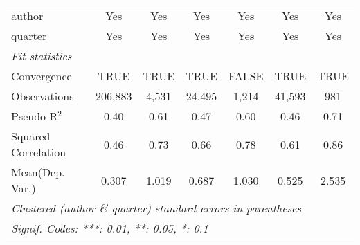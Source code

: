 \begin{tabular}{lcccccc}
   author                                                     & Yes           & Yes           & Yes           & Yes           & Yes          & Yes\\  
   quarter                                                    & Yes           & Yes           & Yes           & Yes           & Yes          & Yes\\  
   \midrule
   \emph{Fit statistics}\\
   Convergence                                                &TRUE           & TRUE          & TRUE          & FALSE         & TRUE         & TRUE\\  
   Observations                                               & 206,883       & 4,531         & 24,495        & 1,214         & 41,593       & 981\\  
   Pseudo R$^2$                                               & 0.40          & 0.61          & 0.47          & 0.60          & 0.46         & 0.71\\  
   Squared Correlation                                        & 0.46          & 0.73          & 0.66          & 0.78          & 0.61         & 0.86\\  
Mean(Dep. Var.) & 0.307 & 1.019 & 0.687 & 1.030 & 0.525 & 2.535 \\
   \midrule \midrule
   \multicolumn{7}{l}{\emph{Clustered (author \& quarter) standard-errors in parentheses}}\\
   \multicolumn{7}{l}{\emph{Signif. Codes: ***: 0.01, **: 0.05, *: 0.1}}\\
\end{tabular}
\par\endgroup
